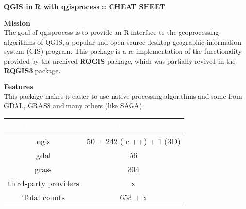 \documentclass{article}
\begin{document}
\pagestyle{footerstyle}
\begin{flushleft}
  \begin{adjustbox}{width=850pt}
    \fontsize{40}{30}\selectfont\textbf{QGIS in R with qgisprocess :: CHEAT SHEET}
  \end{adjustbox}
\end{flushleft}


\begin{multicols*}{3}
\setlength{\columnsep}{400pt}

\begin{minipage}{\linewidth}
  \vspace{-10pt}
   \textbf{\fontsize{44}{44}\selectfont \textbf{Mission}}\vspace{8pt}\\
   The goal of qgisprocess is to provide an R interface to the geoprocessing algorithms of QGIS, a popular and open source desktop geographic information system (GIS) program. This package is a re-implementation of the functionality provided by the archived \textbf{RQGIS} package, which was partially revived in the \textbf{RQGIS3} package.
\end{minipage}

\begin{minipage}{\linewidth}
  \vspace{1pt}
   \textbf{\fontsize{20}{5}\selectfont \textbf{Features}}\vspace{8pt}\\
  This package makes it easier to use native processing algorithms and some from GDAL, GRASS and many others (like SAGA).

\begin{center}
\setlength{\arrayrulewidth}{0.001pt}
\renewcommand{\arraystretch}{1.25}
\begin{tabular}{|c|c|}
  \hline
  \rowcolor{mycolor}
  \textcolor{white}{\textbf{Providers}} & \textcolor{white}{\textbf{Algorithms}} \\
  \hline
  qgis &  50 + 242 ( c ++) + 1 (3D) \\
  \hline
  gdal & 56 \\
  \hline
  grass & 304 \\
  \hline
  third-party providers & x \\
  \hline
  Total counts & 653 + x \\
  \hline
\end{tabular}
\end{center}
\end{minipage}


\end{multicols*}
\end{document}
